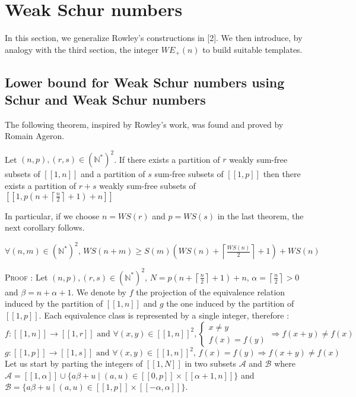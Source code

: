 \section{Weak Schur numbers}

In this section, we generalize Rowley's constructions in [2]. We then introduce, by analogy with the third section, the integer \(WE_+(n)\) 
to build suitable templates.

\subsection{Lower bound for Weak Schur numbers using Schur and Weak Schur numbers}

The following theorem, inspired by Rowley's work, was found and proved by Romain Ageron.
\begin{theorem}
	Let $(n,p), (r,s) \in (\mathbb{N}^*)^2$. If there exists a partition of $r$ weakly sum-free subsets of $[\![1,n]\!]$ and a partition of $s$ sum-free 
	subsets of $[\![1,p]\!]$ then there exists a partition of $r+s$ weakly sum-free subsets of $[\![1,p(n+\left \lceil \frac{n}{2} \right \rceil + 1)+n]\!]$
\end{theorem}
In particular, if we choose $n = WS(r)$ and $p = WS(s)$ in the last theorem, the next corollary follows.
\begin{corollary}
	$ \forall (n,m) \in (\mathbb{N}^*)^2 \text{, } WS(n+m) \geqslant S(m) \left (WS(n) + \left \lceil \frac{WS(n)}{2} \right \rceil +1 \right) + WS(n)$
\end{corollary}
\textsc{Proof :} Let $(n,p), (r,s) \in (\mathbb{N}^*)^2$,  $N = p(n+\left \lceil \frac{n}{2} \right \rceil + 1)+n$, $\alpha = \left \lceil \frac{n}{2} \right \rceil > 0$ and $\beta = n + \alpha + 1$. We denote by $f$ the projection of the equivalence relation induced by the partition of $[\![1,n]\!]$ and $g$ the one induced by the partition of $[\![1,p]\!]$. Each equivalence class is represented by a single integer, therefore :
\[ f : [\![1,n]\!] \longrightarrow [\![1,r]\!] \text{ and } \forall (x,y) \in [\![1,n]\!]^2, \left\{
\begin{array}{ll}
	x \neq y \\
	f(x) = f(y)
\end{array}
\right.
\Longrightarrow f(x+y) \neq f(x)
\]
\[g : [\![1,p]\!] \longrightarrow [\![1,s]\!] \text{ and } \forall (x,y) \in [\![1,n]\!]^2 \text{, } f(x) = f(y) \Longrightarrow f(x+y) \neq f(x)
\]
Let us start by parting the integers of $[\![1,N]\!]$ in two subsets $\mathcal{A}$ and $\mathcal{B}$ where $\mathcal{A} = [\![1,\alpha]\!] \cup \{a\beta + u \mid (a,u) \in [\![0,p]\!] \times [\![\alpha + 1,n]\!]\}$ and $\mathcal{B} = \{a\beta + u \mid (a,u) \in [\![1,p]\!] \times [\![-\alpha,\alpha]\!]\}$.\\
